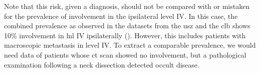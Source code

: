 \documentclass[\relativeRoot/main.tex]{subfiles}
\begin{document}
Note that this risk, given a diagnosis, should not be compared with or mistaken for the prevalence of involvement in the ipsilateral level IV. In this case, the combined prevalence as observed in the datasets from the \gls{usz} and the \gls{clb} shows 10\% involvement in \gls{lnl} IV ipsilaterally (). However, this includes patients with macroscopic metastasis in level IV. To extract a comparable prevalence, we would need data of patients whose \gls{ct} scan showed no involvement, but a pathological examination following a neck dissection detected occult disease.
\end{document}
